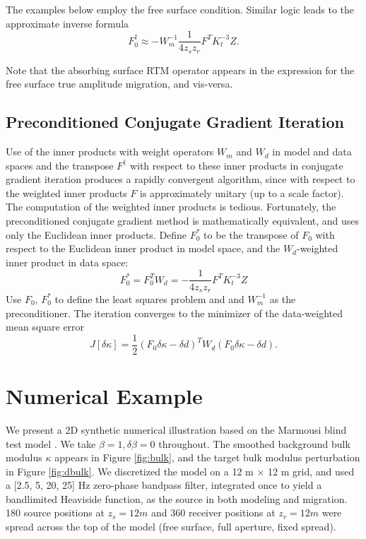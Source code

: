 The examples below employ the free surface condition. Similar logic
leads to the approximate inverse formula
\begin{equation}
\label{eqn:appinvfr}
F_0^{\dagger} \approx - W_m^{-1} \frac{1}{4z_sz_r}F^TK_t^{-3}Z.
\end{equation}

Note that the absorbing surface RTM operator appears in the expression
for the free surface true amplitude migration, and vis-versa.

\subsection{Preconditioned Conjugate Gradient Iteration}
Use of the inner products with weight operators $W_m$ and $W_d$ in
model and data spaces and the transpose $F^{\dagger}$ with respect to
these inner products in conjugate gradient iteration produces a rapidly convergent algorithm, since
with respect to the weighted inner products $F$ is approximately
unitary (up to a scale factor). The computation of the weighted inner products is
tedious. Fortunately, the preconditioned conjugate gradient method
\cite[]{Golub:2012} is
mathematically equivalent, and uses only the Euclidean inner
products. Define $F_0^*$ to be the transpose of $F_0$ with respect to the
Euclidean inner product in model space, and the $W_d$-weighted inner
product in data space:
\begin{equation}
\label{eqn:uwadj}
F_0^* = F_0^T W_d = - \frac{1}{4z_sz_r}F^TK_t^{-3}Z
\end{equation}
Use $F_0$, $F_0^*$ to define the least squares problem and and
$W_m^{-1}$ as the preconditioner. The iteration converges to the minimizer of the
data-weighted mean square error
\begin{equation}
\label{eqn:obj}
J[\delta \kappa] = \frac{1}{2}(F_0\delta \kappa -\delta d)^T W_d
(F_0\delta \kappa -\delta d).
\end{equation}

\section{Numerical Example}
We present a 2D synthetic numerical illustration based on the Marmousi
blind test model \cite[]{BoLaVe:91}. We take $\beta = 1, \delta \beta = 0$
throughout. The smoothed background bulk modulus $\kappa$ appears in
Figure \ref{fig:bulk}, and the target bulk modulus perturbation in
Figure \ref{fig:dbulk}.  We discretized the model on a 12 m $\times$
12 m grid, and used a [2.5, 5, 20, 25] Hz zero-phase bandpass filter, integrated
once to yield a bandlimited Heaviside function, as the source in both
modeling and migration. 180 source positions at $z_s=12 m$ and 360
receiver positions at $z_r=12 m$ were spread across the top of the
model (free surface, full aperture, fixed spread). 

